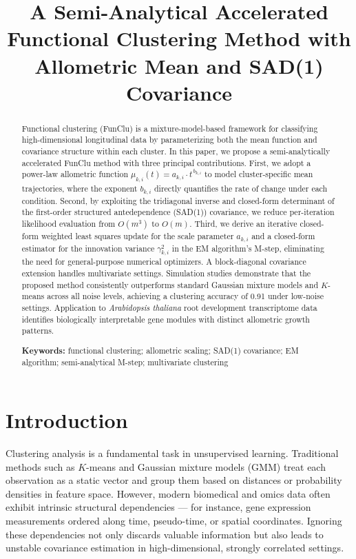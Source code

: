 \documentclass[12pt,a4paper]{article}
\title{\textbf{A Semi-Analytical Accelerated Functional Clustering Method with Allometric Mean and SAD(1) Covariance}}
\author{}
\date{}
\begin{document}
\maketitle

\begin{abstract}
Functional clustering (FunClu) is a mixture-model-based framework for classifying high-dimensional longitudinal data by parameterizing both the mean function and covariance structure within each cluster. In this paper, we propose a semi-analytically accelerated FunClu method with three principal contributions. First, we adopt a power-law allometric function $\mu_{k,i}(t) = a_{k,i} \cdot t^{\,b_{k,i}}$ to model cluster-specific mean trajectories, where the exponent $b_{k,i}$ directly quantifies the rate of change under each condition. Second, by exploiting the tridiagonal inverse and closed-form determinant of the first-order structured antedependence (SAD(1)) covariance, we reduce per-iteration likelihood evaluation from $O(m^3)$ to $O(m)$. Third, we derive an iterative closed-form weighted least squares update for the scale parameter $a_{k,i}$ and a closed-form estimator for the innovation variance $\gamma_{k,i}^2$ in the EM algorithm's M-step, eliminating the need for general-purpose numerical optimizers. A block-diagonal covariance extension handles multivariate settings. Simulation studies demonstrate that the proposed method consistently outperforms standard Gaussian mixture models and $K$-means across all noise levels, achieving a clustering accuracy of 0.91 under low-noise settings. Application to \textit{Arabidopsis thaliana} root development transcriptome data identifies biologically interpretable gene modules with distinct allometric growth patterns.

\medskip
\noindent\textbf{Keywords:} functional clustering; allometric scaling; SAD(1) covariance; EM algorithm; semi-analytical M-step; multivariate clustering
\end{abstract}

\section{Introduction}

Clustering analysis is a fundamental task in unsupervised learning. Traditional methods such as $K$-means \cite{xu2005survey} and Gaussian mixture models (GMM) \cite{banfield1993model} treat each observation as a static vector and group them based on distances or probability densities in feature space. However, modern biomedical and omics data often exhibit intrinsic structural dependencies --- for instance, gene expression measurements ordered along time, pseudo-time, or spatial coordinates. Ignoring these dependencies not only discards valuable information but also leads to unstable covariance estimation in high-dimensional, strongly correlated settings.
\end{document}
